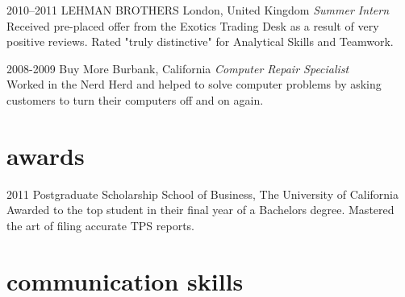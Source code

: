 \documentclass[a4paper]{cv-friggeri-k}
\begin{document}
\begin{entrylist}

\entry
{2010--2011}
{LEHMAN BROTHERS}
{London, United Kingdom}
{\emph{Summer Intern} \\
Received pre-placed offer from the Exotics Trading Desk as a result of very positive reviews. Rated "truly distinctive" for Analytical Skills and Teamwork.}


\entry
{2008-2009}
{Buy More}
{Burbank, California}
{\emph{Computer Repair Specialist} \\
Worked in the Nerd Herd and helped to solve computer problems by asking customers to turn their computers off and on again.}


\end{entrylist}


\section{awards}

\begin{entrylist}


\entry
{2011}
{Postgraduate Scholarship}
{School of Business, The University of California}
{Awarded to the top student in their final year of a Bachelors degree. Mastered the art of filing accurate TPS reports.}


\end{entrylist}


\section{communication skills}
\end{document}
